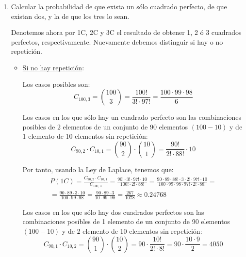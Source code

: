 \begin{ejercicio}
\begin{enumerate}
        \item Calcular la probabilidad de que exista un sólo cuadrado perfecto, de que existan dos, y la de que los tres lo sean.

        Denotemos ahora por 1C, 2C y 3C el resultado de obtener 1, 2 ó 3 cuadrados perfectos, respectivamente. Nuevamente debemos distinguir si hay o no repetición.

        \begin{itemize}
            \item \underline{Si no hay repetición}:

            Los casos posibles son:
            \begin{equation*}
                C_{100,3}=\binom{100}{3}=\frac{100!}{3!\cdot 97!} = \frac{100\cdot 99\cdot 98}{6}
            \end{equation*}

            Los casos en los que sólo hay un cuadrado perfecto son las combinaciones posibles de 2 elementos de un conjunto de 90 elementos $(100-10)$ y de 1 elemento de 10 elementos sin repetición:
            \begin{equation*}
                C_{90,2}\cdot C_{10,1}=\binom{90}{2}\cdot \binom{10}{1}=\frac{90!}{2!\cdot 88!}\cdot 10
            \end{equation*}

            Por tanto, usando la Ley de Laplace, tenemos que:
            \begin{multline*}
                P(1C)=\frac{C_{90,2}\cdot C_{10,1}}{C_{100,3}}=\frac{90!\cdot 3!\cdot 97!\cdot 10}{100!\cdot 2!\cdot 88!}
                =\frac{90\cdot 89\cdot 88!\cdot 3\cdot 2!\cdot 97!\cdot 10}{100\cdot 99\cdot 98 \cdot 97!\cdot 2!\cdot 88!}
                =\\=
                \frac{90\cdot 89\cdot 3\cdot 10}{100\cdot 99\cdot 98} =
                \frac{90\cdot 89\cdot 3}{10\cdot 99\cdot 98} =\frac{267}{1078} \approx 0.24768
            \end{multline*}


            Los casos en los que sólo hay dos cuadrados perfectos son las combinaciones posibles de 1 elemento de un conjunto de 90 elementos $(100-10)$ y de 2 elemento de 10 elementos sin repetición:
            \begin{equation*}
                C_{90,1}\cdot C_{10,2}=\binom{90}{1}\cdot \binom{10}{2}=90\cdot \frac{10!}{2!\cdot 8!} = 90 \cdot \frac{10\cdot 9}{2}=4050
            \end{equation*}


\end{itemize}
\end{enumerate}
\end{ejercicio}
